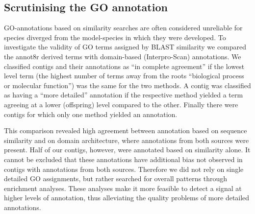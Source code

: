 \documentclass[12pt,a4paper]{article}
\begin{document}
\newpage

\subsection{Scrutinising the GO annotation}
\label{sec:scrut-GO}

GO-annotations based on similarity searches are often considered
unreliable for species diverged from the model-species in which they
were developed. To investigate the validity of GO terms assigned by
BLAST similarity we compared the annot8r derived terms with
domain-based (Interpro-Scan) annotations. We classified contigs and
their annotations as ``in complete agreement'' if the lowest level
term (the highest number of terms away from the roots ``biological
process or molecular function'') was the same for the two methods. A
contig was classified as having a ``more detailed'' annotation if the
respective method yielded a term agreeing at a lower (offspring) level
compared to the other. Finally there were contigs for which only one
method yielded an annotation.

This comparison revealed high agreement between annotation based on
sequence similarity and on domain architecture, where annotations from
both sources were present. Half of our contigs, however, were
annotated based on similarity alone. It cannot be excluded that these
annotations have additional bias not observed in contigs with
annotations from both sources. Therefore we did not rely on single
detailed GO assignments, but rather searched for overall patterns
through enrichment analyses. These analyses make it more feasible to
detect a signal at higher levels of annotation, thus alleviating the
quality problems of more detailed annotations.
\end{document}

